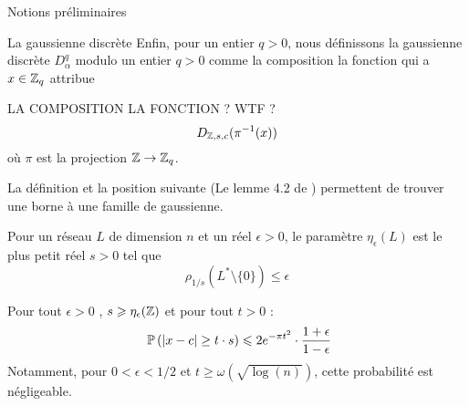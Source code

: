 \begin{section}{Notions préliminaires}
\begin{subsection}{La gaussienne discrète}
	Enfin, pour un entier $q > 0$, nous définissons la gaussienne discrète $D^q_{\alpha}$ modulo un entier $q > 0$ comme la composition la fonction qui a $x \in \mathbb{Z}_q$ attribue 
	
	LA COMPOSITION LA FONCTION ? WTF ?  
		\[ D_{\mathbb{Z}, s, c}(\pi^{-1}(x)) \]
	où $\pi$ est la projection $\mathbb{Z} \rightarrow \mathbb{Z}_q$.

La définition et la position suivante (Le lemme 4.2 de \cite{STOC:GenPeiVai08}) permettent de trouver une borne à une famille de gaussienne.
\begin{definition}
Pour un réseau $L$ de dimension $n$ et un réel $\epsilon > 0$, le paramètre $\eta_\epsilon(L)$ est le plus petit réel $s>0$ tel que 
	\[\rho_{1/s}(L^* \setminus \{0\}) \leqslant \epsilon\]
\end{definition}
	\begin{prop}
	Pour tout $\epsilon > 0$ , $s \geqslant \eta_{\epsilon}(\mathbb{Z})$ et pour tout $t>0$ :
	\[ \PP\left(|x-c| \geq t\cdot s\right) \leqslant 2 e^{-\pi t^2}	\cdot \frac{1+\epsilon}{1-\epsilon} \]
	Notamment, pour $0 < \epsilon  < 1/2$ et $t \geqslant \omega(\sqrt{\log(n)})$, cette probabilité est négligeable.
	\end{prop}
	\end{subsection} %
\end{section}
